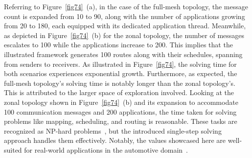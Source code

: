       
      
        
        

      
        Referring to Figure~\ref{fig74}~(a), in the case of the full-mesh topology, the message count is expanded from 10 to 90, along with the number of applications growing from 20 to 180, each equipped with its dedicated application thread. Meanwhile, as depicted in Figure~\ref{fig74}~(b) for the zonal topology, the number of messages escalates to 100 while the applications increase to 200.
        This implies that the illustrated framework generates 100 routes along with their schedules, spanning from senders to receivers. As illustrated in Figure~\ref{fig74}, the solving time for both scenarios experiences exponential growth.
        Furthermore, as expected, the full-mesh topology's solving time is notably longer than the zonal topology's. This is attributed to the larger space of exploration involved.
        Looking at the zonal topology shown in Figure~\ref{fig74}~(b) and its expansion to accommodate 100 communication messages and 200 applications, the time taken for solving problems like mapping, scheduling, and routing is reasonable. These tasks are recognized as NP-hard problems~\cite{atallah2019routing}, but the introduced single-step solving approach handles them effectively. Notably, the values showcased here are well-suited for real-world applications in the automotive domain~\cite{askaripoor2023designer}.





